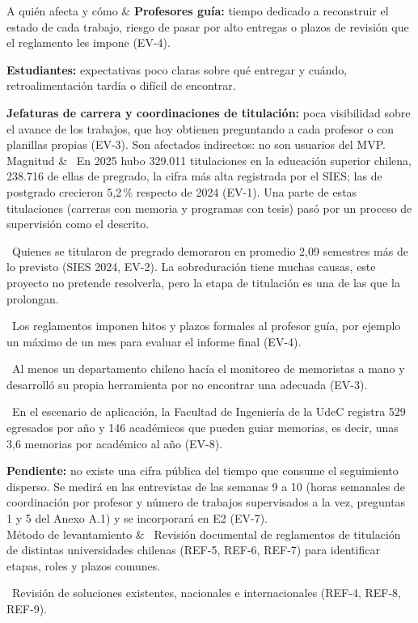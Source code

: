 \documentclass[10pt,a4paper]{article}
\newenvironment{kv}[1][4.6cm]
  {\footnotesize\setlength{\extrarowheight}{3pt}\xltabular{\linewidth}{|E{#1}|L|}\hline}
  {\endxltabular}
\newcommand{\kvrow}[2]{#1 & #2 \\ \hline}
\begin{document}
\begin{kv}[4.2cm]
\kvrow{A quién afecta y cómo}{%
\textbf{Profesores guía:} tiempo dedicado a reconstruir el estado de cada trabajo, riesgo de pasar por alto entregas o plazos de revisión que el reglamento les impone (EV-4).\par
\textbf{Estudiantes:} expectativas poco claras sobre qué entregar y cuándo, retroalimentación tardía o difícil de encontrar.\par
\textbf{Jefaturas de carrera y coordinaciones de titulación:} poca visibilidad sobre el avance de los trabajos, que hoy obtienen preguntando a cada profesor o con planillas propias (EV-3). Son afectados indirectos: no son usuarios del MVP.}
\kvrow{Magnitud}{%
\textbullet~En 2025 hubo 329.011 titulaciones en la educación superior chilena, 238.716 de ellas de pregrado, la cifra más alta registrada por el SIES; las de postgrado crecieron 5,2\,\% respecto de 2024 (EV-1). Una parte de estas titulaciones (carreras con memoria y programas con tesis) pasó por un proceso de supervisión como el descrito.\par
\textbullet~Quienes se titularon de pregrado demoraron en promedio 2,09 semestres más de lo previsto (SIES 2024, EV-2). La sobreduración tiene muchas causas, este proyecto no pretende resolverla, pero la etapa de titulación es una de las que la prolongan.\par
\textbullet~Los reglamentos imponen hitos y plazos formales al profesor guía, por ejemplo un máximo de un mes para evaluar el informe final (EV-4).\par
\textbullet~Al menos un departamento chileno hacía el monitoreo de memoristas a mano y desarrolló su propia herramienta por no encontrar una adecuada (EV-3).\par
\textbullet~En el escenario de aplicación, la Facultad de Ingeniería de la UdeC registra 529 egresados por año y 146 académicos que pueden guiar memorias, es decir, unas 3,6 memorias por académico al año (EV-8).\par
\textbf{Pendiente:} no existe una cifra pública del tiempo que consume el seguimiento disperso. Se medirá en las entrevistas de las semanas 9 a 10 (horas semanales de coordinación por profesor y número de trabajos supervisados a la vez, preguntas 1 y 5 del Anexo A.1) y se incorporará en E2 (EV-7).}
\kvrow{Método de levantamiento}{%
\textbullet~Revisión documental de reglamentos de titulación de distintas universidades chilenas (REF-5, REF-6, REF-7) para identificar etapas, roles y plazos comunes.\par
\textbullet~Revisión de soluciones existentes, nacionales e internacionales (REF-4, REF-8, REF-9).\par
}
\end{kv}
\end{document}
